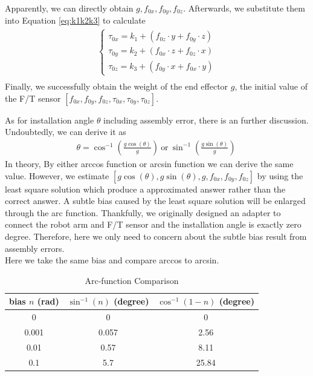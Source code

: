 Apparently, we can directly obtain $g,f_{0x},f_{0y},f_{0z}$. Afterwards, we substitute them into Equation \ref{eq:k1k2k3} to calculate 
\begin{equation}
\begin{split}
\left\{\begin{matrix}
\tau _{0x}	=	k_1	+ \left( f_{0z} \cdot y + f_{0y} \cdot z \right) \\
\tau _{0y} 	=	k_2	+ \left( f_{0x} \cdot z + f_{0z} \cdot x \right) \\
\tau _{0z} 	=	k_3 + \left( f_{0y} \cdot x + f_{0x} \cdot y \right)
\end{matrix}\right.\\
\end{split}
\end{equation}
Finally, we successfully obtain the weight of the end effector $g$, the initial value of the F/T sensor $[f_{0x},f_{0y},f_{0z},\tau_{0x},\tau_{0y},\tau_{0z}]$.
\par
As for installation angle $\theta$ including assembly error,  there is an further discussion. Undoubtedly, we can derive it as
\begin{equation}
\begin{split}
\theta = \cos^{-1}\left(\frac{g\cos(\theta)}{g}\right)\ \text{or} \ \sin^{-1}\left(\frac{g\sin(\theta)}{g}\right)\
\end{split}
\end{equation}
In theory, By either arccos function or arcsin function we can derive the same value. However, we estimate $[g\cos(\theta),g\sin(\theta),g,f_{0x},f_{0y},f_{0z}]$ by using the least square solution which produce a approximated answer rather than the correct answer. A subtle bias caused by the least square solution will be enlarged through the arc function. 
Thankfully, we originally designed an adapter to connect the robot arm and F/T sensor and the installation angle is exactly zero degree. Therefore, here we only need to concern about the subtle bias result from assembly errors.\\
Here we take the same bias and compare arccos to arcsin. 
\begin{table}[htbp]
\centering
\caption{Arc-function Comparison}
\label{tab:arc}
\begin{tabular}{c|c|c} 
\hline \hline
bias $n$ (rad)	&$\sin^{-1}(n)$	(degree)	&$\cos^{-1}(1-n)$ (degree)\\
\hline
0				&0							&0\\
0.001			&0.057						&2.56\\
0.01			&0.57						&8.11\\
0.1				&5.7						&25.84\\
\hline\hline
\end{tabular}
\end{table}
